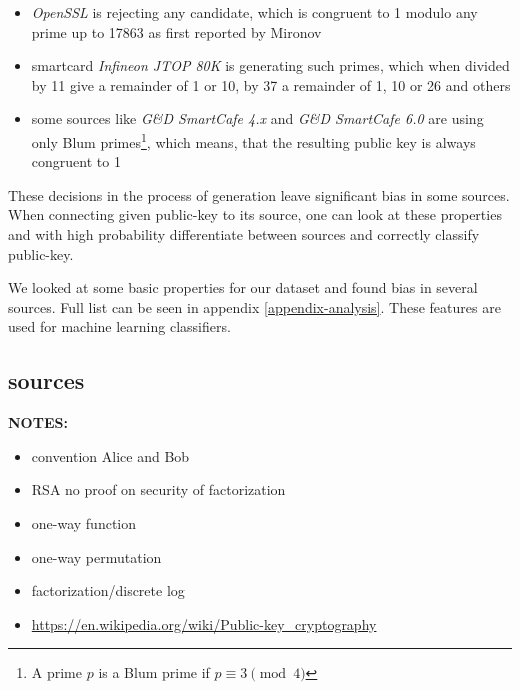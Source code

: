\begin{itemize}

\item \textit{OpenSSL} is rejecting any candidate, which is congruent to 1 modulo any prime up to 17863 as first reported by Mironov\cite{mironov}

\item smartcard \textit{Infineon JTOP 80K} is generating such primes, which when divided by 11 give a remainder of 1 or 10, by 37 a remainder of 1, 10 or 26 and others

\item some sources like \textit{G\&D SmartCafe 4.x} and \textit{G\&D SmartCafe 6.0} are using only Blum primes\footnote{A prime $p$ is a Blum prime if $p \equiv 3 \pmod{4}$}, which means, that the resulting public key is always congruent to 1

\end{itemize}

These decisions in the process of generation leave significant bias in some sources. When connecting given public-key to its source, one can look at these properties and with high probability differentiate between sources and correctly classify public-key.

We looked at some basic properties for our dataset and found bias in several sources. Full list can be seen in appendix \ref{appendix-analysis}. These features are used for machine learning classifiers.

\subsection*{sources}


\textbf{NOTES:}
\begin{itemize}
\item convention Alice and Bob
\item RSA no proof on security of factorization
\item one-way function
\item one-way permutation
\item factorization/discrete log
\item \url{https://en.wikipedia.org/wiki/Public-key_cryptography}
\end{itemize}
